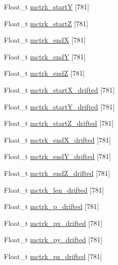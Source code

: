 \begin{DoxyCompactItemize}
\item 
Float\-\_\-t \hyperlink{classanatree_ad0c7a5b476381e6e017e82392ed06f7e}{mctrk\-\_\-start\-Y} \mbox{[}781\mbox{]}
\item 
Float\-\_\-t \hyperlink{classanatree_a16081a2b4c910260b1ce8374cb9a5f1c}{mctrk\-\_\-start\-Z} \mbox{[}781\mbox{]}
\item 
Float\-\_\-t \hyperlink{classanatree_a56991dea723aa6abbdbb91934c60c9b7}{mctrk\-\_\-end\-X} \mbox{[}781\mbox{]}
\item 
Float\-\_\-t \hyperlink{classanatree_abefe0687882e47120f8c075d606e783a}{mctrk\-\_\-end\-Y} \mbox{[}781\mbox{]}
\item 
Float\-\_\-t \hyperlink{classanatree_aa09b922fc0757b0d77de4a476e2f7b18}{mctrk\-\_\-end\-Z} \mbox{[}781\mbox{]}
\item 
Float\-\_\-t \hyperlink{classanatree_aedee6b5127f774aeeb8c05bab7bd12b1}{mctrk\-\_\-start\-X\-\_\-drifted} \mbox{[}781\mbox{]}
\item 
Float\-\_\-t \hyperlink{classanatree_a65d327d83db67f6bad92b0a83466e190}{mctrk\-\_\-start\-Y\-\_\-drifted} \mbox{[}781\mbox{]}
\item 
Float\-\_\-t \hyperlink{classanatree_a9c8ea5281a9676e8c414a680d390a57a}{mctrk\-\_\-start\-Z\-\_\-drifted} \mbox{[}781\mbox{]}
\item 
Float\-\_\-t \hyperlink{classanatree_a626ecccc567c38f435ea604dafd4be44}{mctrk\-\_\-end\-X\-\_\-drifted} \mbox{[}781\mbox{]}
\item 
Float\-\_\-t \hyperlink{classanatree_aeaff87f01d8e799b1ff16122447d44f3}{mctrk\-\_\-end\-Y\-\_\-drifted} \mbox{[}781\mbox{]}
\item 
Float\-\_\-t \hyperlink{classanatree_a9285fa2ffc0bb2fda0b32c0d6b1ada38}{mctrk\-\_\-end\-Z\-\_\-drifted} \mbox{[}781\mbox{]}
\item 
Float\-\_\-t \hyperlink{classanatree_a587dfac24fac35021b281c3a2d96daf6}{mctrk\-\_\-len\-\_\-drifted} \mbox{[}781\mbox{]}
\item 
Float\-\_\-t \hyperlink{classanatree_a79f7f59f922538a28b1e3418c6b0630a}{mctrk\-\_\-p\-\_\-drifted} \mbox{[}781\mbox{]}
\item 
Float\-\_\-t \hyperlink{classanatree_a897a99b9eb709719c79e6389a8e31221}{mctrk\-\_\-px\-\_\-drifted} \mbox{[}781\mbox{]}
\item 
Float\-\_\-t \hyperlink{classanatree_a534eca9e46f0ef13d81de3a6c01ca9f3}{mctrk\-\_\-py\-\_\-drifted} \mbox{[}781\mbox{]}
\item 
Float\-\_\-t \hyperlink{classanatree_aad4d05e1a44689cdaade31ed085e50dc}{mctrk\-\_\-pz\-\_\-drifted} \mbox{[}781\mbox{]}

\end{DoxyCompactItemize}

